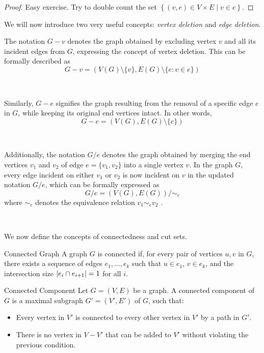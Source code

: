 \documentclass[../basic_graph_theory.tex]{subfiles}
\begin{document}
\begin{proof}
  Easy exercise. Try to double count the set $ \left\{ (v, e) \in V \times E \mid v \in e \right\} $.
\end{proof}

We will now introduce two very useful concepts: \textit{vertex deletion} and \textit{edge deletion}.

The notation $G - v$ denotes the graph obtained by excluding vertex $v$ and all its incident edges from $G$, expressing the concept of vertex deletion. This can be formally described as \[ G - v = (V(G) \setminus \{v\}, E(G) \setminus \{e : v \in e\}) \]

\

Similarly, $G - e$ signifies the graph resulting from the removal of a specific edge $e$ in $G$, while keeping its original end vertices intact. In other words, \[ G - e = (V(G), E(G) \setminus \{e\}) \]

\

Additionally, the notation $G / e$ denotes the graph obtained by merging the end vertices $v_1$ and $v_2$ of edge $e = \{v_1, v_2\}$ into a single vertex $v$. In the graph $G$, every edge incident on either $v_1$ or $v_2$ is now incident on $v$ in the updated notation $G/e$, which can be formally expressed as
\[ G / e = (V(G), E(G)) / \sim_{e} \]
where $\sim_{e}$ denotes the equivalence relation $v_1 \sim_{e} v_2$ .

\

We now define the concepts of connectedness and cut sets.

\begin{Def}{Connected Graph}{}
  A graph \( G \) is connected if, for every pair of vertices \( u, v \) in \( G \), there exists a sequence of edges \( e_1, \dots, e_k \) such that \( u \in e_1 \), \( v \in e_k \), and the intersection size \( \abs{e_i \cap e_{i+1}} = 1 \) for all \( i \).
\end{Def}

\begin{Def}{Connected Component}{}
  Let \( G = (V, E) \) be a graph. A connected component of \( G \) is a maximal subgraph \( G' = (V', E') \) of \( G \), such that:
  \begin{itemize}
    \item Every vertex in \( V' \) is connected to every other vertex in \( V' \) by a path in \( G' \).
    \item There is no vertex in \( V - V' \) that can be added to \( V' \) without violating the previous condition.
  \end{itemize}
\end{Def}
\end{document}
